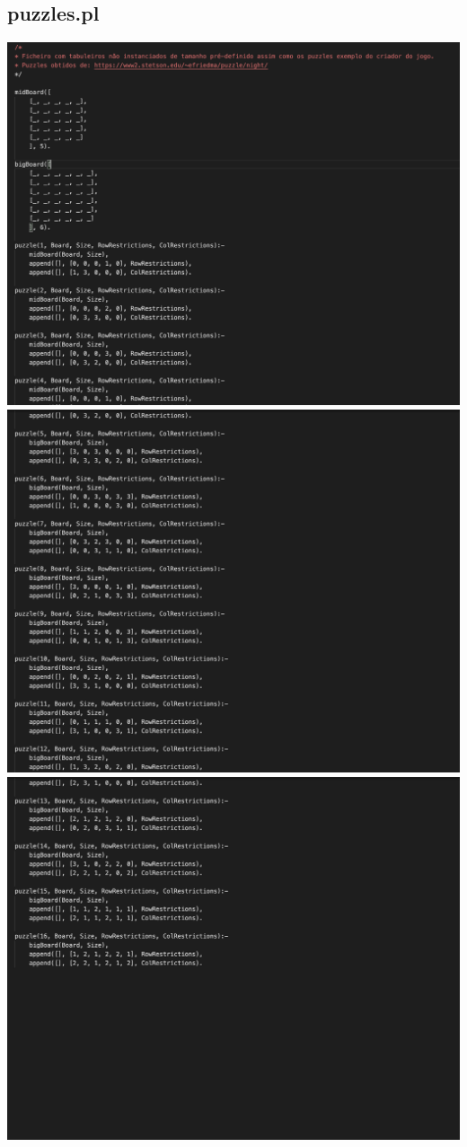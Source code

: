 \documentclass[a4paper]{article}
\begin{document}
\subsection{puzzles.pl}
\begin{center}
    \includegraphics[scale=0.4]{img/18.png}
    \includegraphics[scale=0.4]{img/19.png}
    \includegraphics[scale=0.4]{img/20.png}

\end{center}
\end{document}
